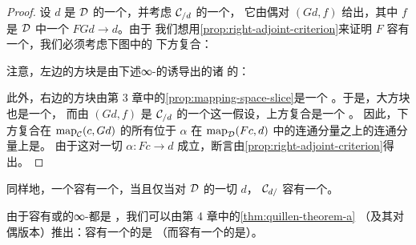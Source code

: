 \begin{proof}
设 $d$ 是 $\mathcal{D}$ 的一个\trObject{}，并考虑 $\mathcal{C}_{/d}$ 的一个\trTerminalObject{}，
它由偶对 $(Gd, f)$ 给出，其中 $f$ 是 $\mathcal{D}$ 中一个\trMorphism{} $FGd \to d$。由于
我们想用\cref{prop:right-adjoint-criterion}来证明 $F$ 容有一个\trRightAdjoint{}，我们必须考虑下图中的
下方复合：
\begin{center}
\end{center}
注意，左边的方块是由下述∞-\trCategories{}的\trPullback{}诱导出的诸%
\trMappingSpace{}的\trPullback{}：
\begin{center}
\end{center}
此外，右边的方块由第 3 章中的\cref{prop:mapping-space-slice}是一个%
\trHomotopy{}\trPullback{}。于是，大方块也是一个\trHomotopy{}\trPullback{}，
而由 $(Gd, f)$ 是 $\mathcal{C}_{/d}$ 的一个\trTerminalObject{}这一假设，上方复合是一个%
\trEquivalence{}。
因此，下方复合在 $\mathrm{map}_{\mathcal{C}}(c, Gd)$ 的所有位于 $\alpha$ 在
$\mathrm{map}_{\mathcal{D}}(Fc, d)$ 中的连通分量之上的连通分量上是\trEquivalence{}。
由于这对一切 $\alpha\colon Fc \to d$ 成立，断言由\cref{prop:right-adjoint-criterion}得出。
\end{proof}

\begin{remark}\label{rem:left-adjoint-initial-slice}
同样地，一个\trFunctor{}容有一个\trLeftAdjoint{}，当且仅当对 $\mathcal{D}$ 的一切%
\trObject{} $d$，\trCategory{} $\mathcal{C}_{d/}$ 容有一个\trInitialObject{}。
\end{remark}

\begin{remark}\label{rem:adjoint-cofinal-coinitial}
由于容有\trTerminalObject{}或\trInitialObject{}的∞-\trCategories{}都是%
\trWeaklyContractible{}，我们可以由第 4 章中的\cref{thm:quillen-theorem-a}
（及其对偶版本）推出：容有一个\trLeftAdjoint{}的\trFunctor{}是\trCofinal{}%
（而容有一个\trRightAdjoint{}的\trFunctor{}是\trCoinitial{}）。
\end{remark}

